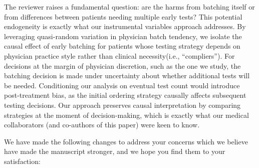 \documentclass[11pt]{article}
\newcommand{\1}{\hbox{\rm 1\kern-.35em 1}}
\begin{document}
The reviewer raises a fundamental question: are the harms from batching itself or from differences between patients needing multiple early tests? This potential endogeneity is exactly what our instrumental variables approach addresses. By leveraging quasi-random variation in physician batch tendency, we isolate the causal effect of early batching for patients whose testing strategy depends on physician practice style rather than clinical necessity(i.e., ``compliers''). For decisions at the margin of physician discretion, such as the one we study, the batching decision is made under uncertainty about whether additional tests will be needed. Conditioning our analysis on eventual test count would introduce post-treatment bias, as the initial ordering strategy causally affects subsequent testing decisions. Our approach preserves causal interpretation by comparing strategies at the moment of decision-making, which is exactly what our medical collaborators (and co-authors of this paper) were keen to know.

We have made the following changes to address your concerns which we believe have made the manuscript stronger, and we hope you find them to your satisfaction:
\end{document}
